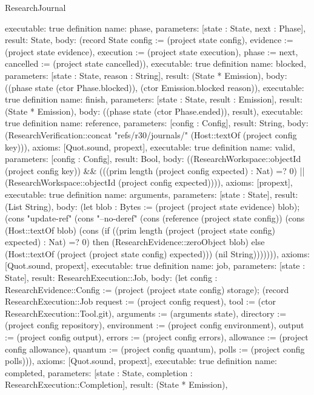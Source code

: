 \begin{lexlean}{ResearchJournal}
\begin{semanticmodule}
{ executable: true
}
definition{
 name: phase,
 parameters: [state : State, next : Phase],
 result: State,
 body: (record State {config := (project state config), evidence := (project state evidence), execution := (project state execution), phase := next, cancelled := (project state cancelled)}),
 executable: true
}
definition{
 name: blocked,
 parameters: [state : State, reason : String],
 result: (State * Emission),
 body: ((phase state (ctor Phase.blocked)), (ctor Emission.blocked reason)),
 executable: true
}
definition{
 name: finish,
 parameters: [state : State, result : Emission],
 result: (State * Emission),
 body: ((phase state (ctor Phase.ended)), result),
 executable: true
}
definition{
 name: reference,
 parameters: [config : Config],
 result: String,
 body: (ResearchVerification::concat "refs/r30/journals/" (Host::textOf (project config key))),
 axioms: [Quot.sound, propext],
 executable: true
}
definition{
 name: valid,
 parameters: [config : Config],
 result: Bool,
 body: ((ResearchWorkspace::objectId (project config key)) && (((prim length (project config expected) : Nat) =? 0) || (ResearchWorkspace::objectId (project config expected)))),
 axioms: [propext],
 executable: true
}
definition{
 name: arguments,
 parameters: [state : State],
 result: (List String),
 body: (let blob : Bytes := (project (project state evidence) blob); (cons "update-ref" (cons "--no-deref" (cons (reference (project state config)) (cons (Host::textOf blob) (cons (if ((prim length (project (project state config) expected) : Nat) =? 0) then (ResearchEvidence::zeroObject blob) else (Host::textOf (project (project state config) expected))) (nil String))))))),
 axioms: [Quot.sound, propext],
 executable: true
}
definition{
 name: job,
 parameters: [state : State],
 result: ResearchExecution::Job,
 body: (let config : ResearchEvidence::Config := (project (project state config) storage); (record ResearchExecution::Job {request := (project config request), tool := (ctor ResearchExecution::Tool.git), arguments := (arguments state), directory := (project config repository), environment := (project config environment), output := (project config output), errors := (project config errors), allowance := (project config allowance), quantum := (project config quantum), polls := (project config polls)})),
 axioms: [Quot.sound, propext],
 executable: true
}
definition{
 name: completed,
 parameters: [state : State, completion : ResearchExecution::Completion],
 result: (State * Emission),
}
\end{semanticmodule}
\end{lexlean}
